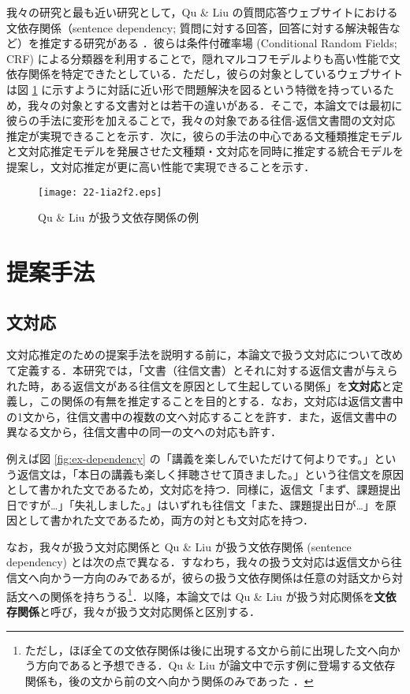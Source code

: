 \documentclass[japanese]{jnlp_1.4}
\begin{document}
我々の研究と最も近い研究として，Qu \& Liu の質問応答ウェブサイトにおける文依存関係（sentence dependency; 質問に対する回答，回答に対する解決報告など）を推定する研究がある \cite{Zhonghua2012}．彼らは条件付確率場 (Conditional Random Fields; CRF) \cite{Lafferty2001} による分類器を利用することで，隠れマルコフモデルよりも高い性能で文依存関係を特定できたとしている．ただし，彼らの対象としているウェブサイトは図 \ref{fig:ex-dependency-c} に示すように対話に近い形で問題解決を図るという特徴を持っているため，我々の対象とする文書対とは若干の違いがある．そこで，本論文では最初に彼らの手法に変形を加えることで，我々の対象である往信-返信文書間の文対応推定が実現できることを示す．次に，彼らの手法の中心である文種類推定モデルと文対応推定モデルを発展させた文種類・文対応を同時に推定する統合モデルを提案し，文対応推定が更に高い性能で実現できることを示す．

\begin{figure}[t]
\begin{center}
\texttt{[image: 22-1ia2f2.eps]}
\end{center}
\caption{Qu \& Liu が扱う文依存関係の例}
\label{fig:ex-dependency-c}
\end{figure}



\section{提案手法}

\subsection{文対応}

文対応推定のための提案手法を説明する前に，本論文で扱う文対応について改めて定義する．本研究では，「文書（往信文書）とそれに対する返信文書が与えられた時，ある返信文がある往信文を原因として生起している関係」を\textbf{文対応}と定義し，この関係の有無を推定することを目的とする．なお，文対応は返信文書中の1文から，往信文書中の複数の文へ対応することを許す．また，返信文書中の異なる文から，往信文書中の同一の文への対応も許す．

例えば図 \ref{fig:ex-dependency} の「講義を楽しんでいただけて何よりです。」という返信文は，「本日の講義も楽しく拝聴させて頂きました。」という往信文を原因として書かれた文であるため，文対応を持つ．同様に，返信文「まず、課題提出日ですが…」「失礼しました。」はいずれも往信文「また、課題提出日が…」を原因として書かれた文であるため，両方の対とも文対応を持つ．

なお，我々が扱う文対応関係と Qu \& Liu \citeyear{Zhonghua2012} が扱う文依存関係 (sentence dependency) とは次の点で異なる．すなわち，我々の扱う文対応は返信文から往信文へ向かう一方向のみであるが，彼らの扱う文依存関係は任意の対話文から対話文への関係を持ちうる\footnote{ただし，ほぼ全ての文依存関係は後に出現する文から前に出現した文へ向かう方向であると予想できる．Qu \& Liu が論文中で示す例に登場する文依存関係も，後の文から前の文へ向かう関係のみであった \cite{Zhonghua2012}．}．以降，本論文では Qu \& Liu が扱う対応関係を\textbf{文依存関係}と呼び，我々が扱う文対応関係と区別する．
\end{document}
